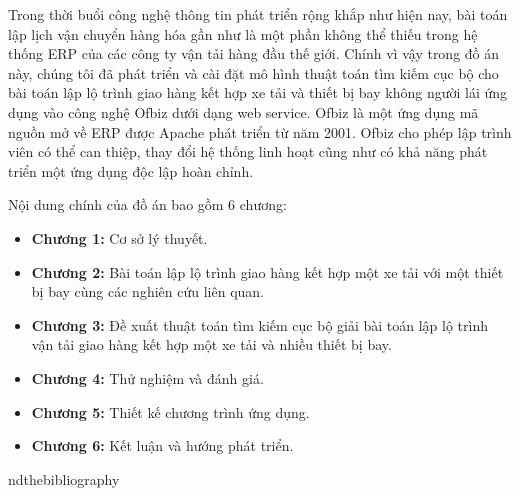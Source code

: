 \documentclass[a4paper,12pt]{report}
\begin{document}
Trong thời buổi công nghệ thông tin phát triển rộng khắp như hiện nay, bài toán lập lịch vận chuyển hàng hóa gần như là một phần không thể thiếu trong hệ thống \ac{ERP} của các công ty vận tải hàng đầu thế giới. Chính vì vậy trong đồ án này, chúng tôi đã phát triển và cài đặt mô hình thuật toán tìm kiếm cục bộ cho bài toán lập lộ trình giao hàng kết hợp xe tải và thiết bị bay không người lái ứng dụng vào công nghệ Ofbiz dưới dạng web service. Ofbiz là một ứng dụng mã nguồn mở về \ac{ERP} được Apache phát triển từ năm 2001. Ofbiz cho phép lập trình viên có thể can thiệp, thay đổi hệ thống linh hoạt cũng như có khả năng phát triển một ứng dụng độc lập hoàn chỉnh. 

Nội dung chính của đồ án bao gồm 6 chương:
\begin{itemize}
\item \textbf{Chương 1:} Cơ sở lý thuyết.
\item \textbf{Chương 2:} Bài toán lập lộ trình giao hàng kết hợp một xe tải với một thiết bị bay cùng các nghiên cứu liên quan.
\item \textbf{Chương 3:} Đề xuất thuật toán tìm kiếm cục bộ giải bài toán lập lộ trình vận tải giao hàng kết hợp một xe tải và nhiều thiết bị bay.
\item \textbf{Chương 4:} Thử nghiệm và đánh giá.
\item \textbf{Chương 5:} Thiết kế chương trình ứng dụng.
\item \textbf{Chương 6:} Kết luận và hướng phát  triển.
\end{itemize}
nd{thebibliography}
\end{document}
